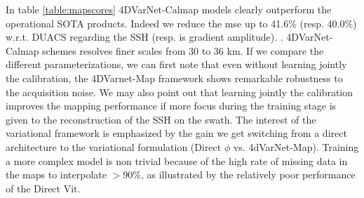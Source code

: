 \documentclass{article}
\begin{document}
In table \ref{table:mapscores} 4DVarNet-Calmap models clearly outperform the operational SOTA products.
Indeed we reduce the mse up to 41.6\% (resp. 40.0\%)  w.r.t. DUACS regarding the SSH (resp. is gradient amplitude). 
.%
4DVarNet-Calmap schemes resolves finer scales from 30 to 36 km. 
If we compare the different parameterizations, we can first note that even without learning jointly the calibration, the 4DVarnet-Map framework shows remarkable robustness to the acquisition noise.
We may also point out that learning jointly the calibration improves the mapping performance if more focus  during the training stage is given to the reconstruction of the SSH on the swath.
The interest of the variational framework is emphasized by  the gain we get switching from a direct architecture to the variational formulation (Direct $\phi$ vs. 4dVarNet-Map).
Training a more complex model is non trivial because of the high rate of missing data in the maps to interpolate $>90\%$, as illustrated by the relatively poor performance of the Direct Vit.
\end{document}
